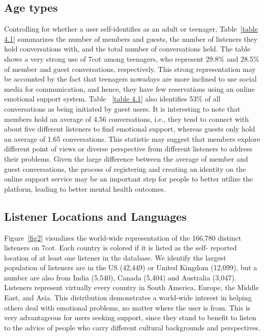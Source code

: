 \subsection{Age types} 
Controlling for whether a user self-identifies as an adult or teenager, Table~\ref{table 4.1} summarizes the number of members and guests, the number of listeners they hold conversations with, and the total number of conversations held. The table shows a very strong use of 7cot among teenagers, who represent 29.8\% and 28.5\% of member and guest conversations, respectively. This strong representation may be accounted by the fact that teenagers nowadays are more inclined to use social media for communication, and hence, they have few reservations using an online emotional support system. Table  ~\ref{table 4.1} also identifies 53\% of all conversations as being initiated by guest users. It is interesting to note that members hold an average of 4.56 conversations, i.e., they tend to connect with about five different listeners to find emotional support, whereas guests only hold an average of 1.65 conversations. This statistic may suggest that members explore different point of views or diverse perspective from different listeners to address their problems. Given the large difference between the average of member and guest conversations, the process of registering and creating an identity on the online support service may be an important step for people to better utilize the platform, leading to better mental health outcomes. 

\subsection{Listener Locations and Languages} Figure~\ref{fig2} visualizes the world-wide representation of the 166,780 distinct listeners on 7cot. Each country is colored if it is listed as the self- reported location of at least one listener in the database. We identify the largest population of listeners are in the US (42,449) or United Kingdom (12,099), but a number are also from India (5,540), Canada (5,404) and Australia (3,047). Listeners represent virtually every country in South America, Europe, the Middle East, and Asia. This distribution demonstrates a world-wide interest in helping others deal with emotional problems, no matter where the user is from. This is very advantageous for users seeking support, since they stand to benefit to listen to the advice of people who carry different cultural backgrounds and perspectives. 

